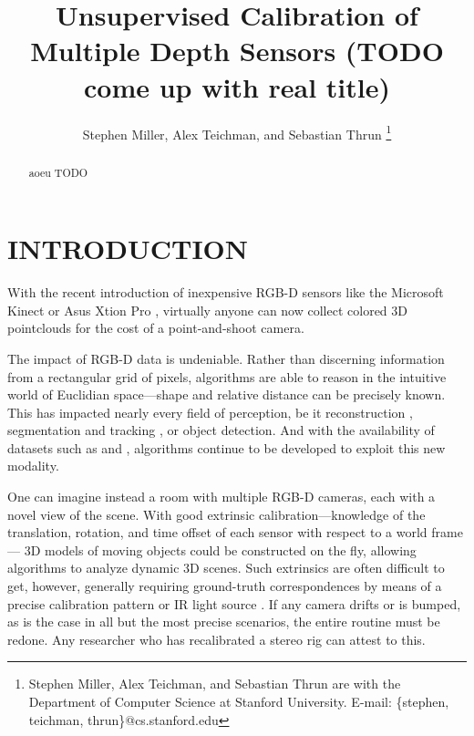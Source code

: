 \documentclass[letterpaper, 10 pt, conference]{ieeeconf}  %
\title{\LARGE \bf
Unsupervised Calibration of Multiple Depth Sensors (TODO come up with real title)}
\author{Stephen Miller, Alex Teichman, and Sebastian Thrun
\thanks{Stephen Miller, Alex Teichman, and Sebastian Thrun are with the Department of Computer Science at Stanford University. \newline E-mail: \{stephen, teichman, thrun\}@cs.stanford.edu } }
\begin{document}
\maketitle
\thispagestyle{empty}
\pagestyle{empty}


\begin{abstract}
aoeu
TODO
\end{abstract}


\section{INTRODUCTION}

With the recent introduction of inexpensive RGB-D sensors like the Microsoft Kinect \cite{kinect} or Asus Xtion Pro \cite{xtion}, virtually anyone 
can now collect colored 3D pointclouds for the cost of a point-and-shoot camera.

The impact of RGB-D data is undeniable. Rather than discerning information from a rectangular grid of pixels, algorithms 
are able to reason in the intuitive world of Euclidian space---shape and relative distance can be precisely known. 
This has impacted nearly every field of perception, be it reconstruction %
, segmentation and tracking %
, or object detection. %
And with the availability of datasets such as \cite{rgbd-dataset} and \cite{nist-dataset}, algorithms continue to 
be developed to exploit this new modality.


One can imagine instead a room with multiple RGB-D cameras, each with a novel view of the scene. With good 
extrinsic calibration---knowledge of the translation, rotation, and time offset of each sensor with respect to a world frame---
3D models of moving objects could be constructed on the fly, allowing algorithms to analyze dynamic 3D scenes. Such extrinsics 
are often difficult to get, however, generally requiring ground-truth correspondences by means of a precise calibration pattern 
\cite{checkerboard} or IR light source \cite{IRlight}. If any camera drifts or is bumped, as is the case in all but the most precise 
scenarios, the entire routine must be redone. Any researcher who has recalibrated a stereo rig can attest to this.
\end{document}
